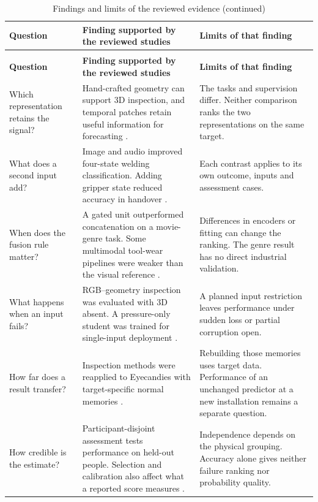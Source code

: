 \begingroup
\small
\begin{longtable}{@{}P{.19\textwidth}P{.36\textwidth}P{.39\textwidth}@{}}
\caption{Findings and limits of the reviewed evidence}
\label{tab:literature-synthesis}\\
\toprule
\textbf{Question} & \textbf{Finding supported by the reviewed studies} & \textbf{Limits of that finding} \\
\midrule
\endfirsthead
\caption[]{Findings and limits of the reviewed evidence (continued)}\\
\toprule
\textbf{Question} & \textbf{Finding supported by the reviewed studies} & \textbf{Limits of that finding} \\
\midrule
\endhead
\bottomrule
\endfoot
Which representation retains the signal? & Hand-crafted geometry can support 3D inspection, and temporal patches retain useful information for forecasting \parencite{horwitz_back_2023,nie_time_2023}. & The tasks and supervision differ. Neither comparison ranks the two representations on the same target. \\[5pt]
What does a second input add? & Image and audio improved four-state welding classification. Adding gripper state reduced accuracy in handover \parencite{fan_dmaw_2026,thoduka_multimodal_2024}. & Each contrast applies to its own outcome, inputs and assessment cases. \\[5pt]
When does the fusion rule matter? & A gated unit outperformed concatenation on a movie-genre task. Some multimodal tool-wear pipelines were weaker than the visual reference \parencite{arevalo_gated_2017,zhang_tool_2026}. & Differences in encoders or fitting can change the ranking. The genre result has no direct industrial validation. \\[5pt]
What happens when an input fails? & RGB--geometry inspection was evaluated with 3D absent. A pressure-only student was trained for single-input deployment \parencite{deng_tc-maf_2026,li_pgmtkd_2025}. & A planned input restriction leaves performance under sudden loss or partial corruption open. \\[5pt]
How far does a result transfer? & Inspection methods were reapplied to Eyecandies with target-specific normal memories \parencite{deng_tc-maf_2026,xu_cross-modal_2026}. & Rebuilding those memories uses target data. Performance of an unchanged predictor at a new installation remains a separate question. \\[5pt]
How credible is the estimate? & Participant-disjoint assessment tests performance on held-out people. Selection and calibration also affect what a reported score measures \parencite{thoduka_multimodal_2024,varma_bias_2006,guo_calibration_2017}. & Independence depends on the physical grouping. Accuracy alone gives neither failure ranking nor probability quality. \\[5pt]
\end{longtable}
\endgroup
